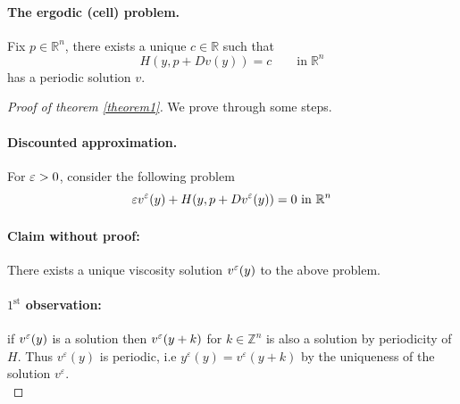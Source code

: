 \documentclass[12pt, oneside]{amsart}  	%
\newcommand\Z{\mathbb{Z}} \newcommand\N{\mathbb{N}} \newcommand\C{\mathbb{C}}
\begin{document}
\paragraph{\textbf{The ergodic (cell) problem.}} Fix $p\in\mathbb{R}^n$, there exists a unique $c\in \mathbb{R}$ such that
\begin{equation}\label{Ergodic_cell_problem}
H(y,p+Dv(y)) = c \qquad\text{in}\;\mathbb{R}^n \tag{$E_p$}
\end{equation}
has a periodic solution $v$.
\begin{proof}[Proof of theorem \ref{theorem1}] We prove through some steps.\\


\paragraph{\textbf{Discounted approximation.}} For $\varepsilon>0$, consider the following problem
\begin{equation*}
\varepsilon v^\varepsilon(y) + H(y, p+Dv^\varepsilon(y))=0 \text{ in } \mathbb{R}^n
\end{equation*}


\paragraph{\textbf{Claim without proof:}} There exists a unique viscosity solution $v^\varepsilon(y)$ to the above problem.\\



\paragraph{\textbf{$1^{\text{st}}$ observation:}} if $v^\varepsilon(y)$ is a solution then $v^\varepsilon(y+k)$ for $k\in \Z^n$ is also a solution by periodicity of $H$. Thus $v^\varepsilon(y)$ is periodic, i.e $y^\varepsilon(y) = v^\varepsilon(y+k)$ by the uniqueness of the solution $v^\varepsilon$.\\




\end{proof}
\end{document}
